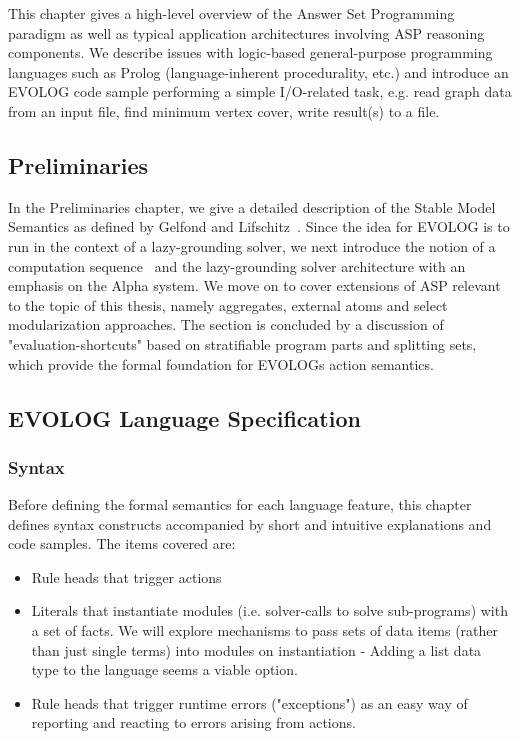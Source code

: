 \documentclass[12pt, letterpaper, twoside]{scrartcl}
\begin{document}
This chapter gives a high-level overview of the Answer Set Programming paradigm as well as typical application architectures involving ASP reasoning components. We describe issues with logic-based general-purpose programming languages such as Prolog (language-inherent procedurality, etc.) and introduce an EVOLOG code sample performing a simple I/O-related task, e.g. read graph data from an input file, find minimum vertex cover, write result(s) to a file.

\subsection{Preliminaries}

In the Preliminaries chapter, we give a detailed description of the Stable Model Semantics as defined by Gelfond and Lifschitz~\cite{stable-models}. Since the idea for EVOLOG is to run in the context of a lazy-grounding solver, we next introduce the notion of a computation sequence~\cite{gasp-compseq} and the lazy-grounding solver architecture with an emphasis on the Alpha system. We move on to cover extensions of ASP relevant to the topic of this thesis, namely aggregates, external atoms and select modularization approaches. The section is concluded by a discussion of "evaluation-shortcuts" based on stratifiable program parts and splitting sets, which provide the formal foundation for EVOLOGs action semantics.

\subsection{EVOLOG Language Specification}

\subsubsection{Syntax}

Before defining the formal semantics for each language feature, this chapter defines syntax constructs accompanied by short and intuitive explanations and code samples. The items covered are:
\begin{itemize}
	\item Rule heads that trigger actions
	\item Literals that instantiate modules (i.e. solver-calls to solve sub-programs) with a set of facts. We will explore mechanisms to pass sets of data items (rather than just single terms) into modules on instantiation - Adding a list data type to the language seems a viable option.
	\item Rule heads that trigger runtime errors ("exceptions") as an easy way of reporting and reacting to errors arising from actions.
\end{itemize}
\end{document}
